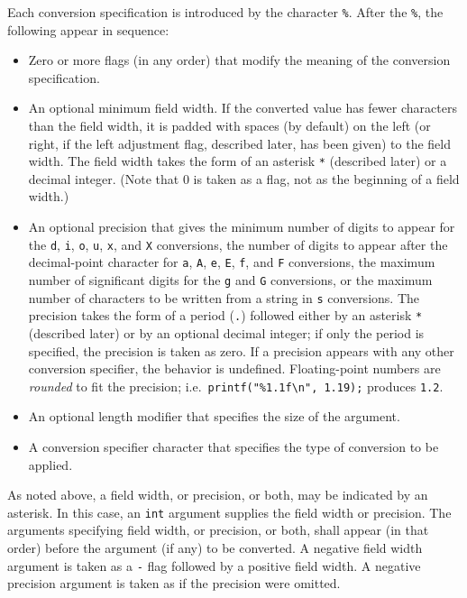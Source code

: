 Each conversion specification is introduced by the character \texttt{\%}. After
the \texttt{\%}, the following appear in sequence:

\begin{itemize}
	\item Zero or more flags (in any order) that modify the meaning of the
conversion specification.
	\item An optional minimum field width. If the converted value has fewer
characters than the field width, it is padded with spaces (by default) on the
left (or right, if the left adjustment flag, described later, has been given)
to the field width. The field width takes the form of an asterisk \texttt{*}
(described later) or a decimal integer. (Note that 0 is taken as a flag, not as
the beginning of a field width.)
	\item An optional precision that gives the minimum number of digits to
appear for the \texttt{d}, \texttt{i}, \texttt{o}, \texttt{u}, \texttt{x}, and
\texttt{X} conversions, the number of digits to appear after the decimal-point
character for \texttt{a}, \texttt{A}, \texttt{e}, \texttt{E}, \texttt{f}, and
\texttt{F} conversions, the maximum number of significant digits for the
\texttt{g} and \texttt{G} conversions, or the maximum number of characters to
be written from a string in \texttt{s} conversions. The precision takes the
form of a period (\texttt{.}) followed either by an asterisk \texttt{*}
(described later) or by an optional decimal integer; if only the period is
specified, the precision is taken as zero. If a precision appears with any
other conversion specifier, the behavior is undefined. Floating-point numbers
are \emph{rounded} to fit the precision; i.e.\
\texttt{printf("\%1.1f\textbackslash{}n", 1.19);} produces \texttt{1.2}.
	\item An optional length modifier that specifies the size of the argument.
	\item A conversion specifier character that specifies the type of
conversion to be applied.
\end{itemize}

As noted above, a field width, or precision, or both, may be indicated by an
asterisk. In this case, an \texttt{int} argument supplies the field width or
precision. The arguments specifying field width, or precision, or both, shall
appear (in that order) before the argument (if any) to be converted. A negative
field width argument is taken as a \texttt{-} flag followed by a positive field
width. A negative precision argument is taken as if the precision were omitted.

